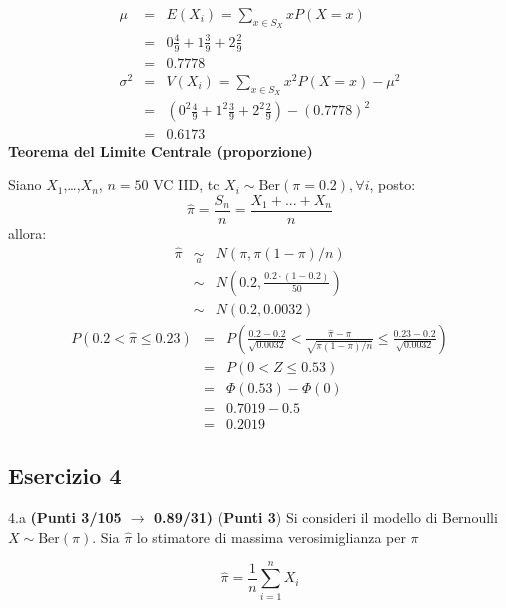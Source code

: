 \documentclass[
  11pt,
]{book}
\theoremstyle{mytheoremstyle}
\theoremstyle{mydefstyle}
\newenvironment{sol}
  {
  \begin{tcolorbox}[enhanced,breakable,arc=0.1mm,boxrule=1pt,colback=white,colframe=iblue,
  title=\bf \fontfamily{lmss}\selectfont \hspace{.5 cm} Soluzione,drop fuzzy shadow]

}{
\end{tcolorbox}
  }
\begin{document}
\begin{sol}
\begin{eqnarray*} \mu &=& E(X_i) = \sum_{x\in S_X}x P(X=x)\\ 
 &=&  0  \frac { 4 }{ 9 }+ 1  \frac { 3 }{ 9 }+ 2  \frac { 2 }{ 9 } \\ 
            &=& 0.7778 \\ 
 \sigma^2 &=& V(X_i) = \sum_{x\in S_X}x^2 P(X=x)-\mu^2\\ 
 &=&\left(  0  ^2\frac { 4 }{ 9 }+ 1  ^2\frac { 3 }{ 9 }+ 2  ^2\frac { 2 }{ 9 } \right)-( 0.7778 )^2\\ 
            &=& 0.6173 
\end{eqnarray*}
\textbf{Teorema del Limite Centrale (proporzione)}

Siano \(X_1\),\ldots,\(X_n\), \(n=50\) VC IID, tc \(X_i\sim\text{Ber}(\pi=0.2)\)\(,\forall i\), posto:
\[
      \hat\pi=\frac{S_n}n = \frac{X_1 + ... + X_n}n
      \]
allora:\begin{eqnarray*}
  \hat\pi & \mathop{\sim}\limits_{a}& N(\pi,\pi(1-\pi)/n) \\
  &\sim & N\left(0.2,\frac{0.2\cdot(1-0.2)}{50}\right) \\
     &\sim & N(0.2,0.0032) 
  \end{eqnarray*}\begin{eqnarray*}
   P( 0.2 < \hat\pi \leq  0.23 ) &=& P\left( \frac { 0.2  -  0.2 }{\sqrt{ 0.0032 }} < \frac { \hat\pi  -  \pi }{ \sqrt{\pi(1-\pi)/n} } \leq \frac { 0.23  -  0.2 }{\sqrt{ 0.0032 }}\right)  \\
              &=& P\left(  0  < Z \leq  0.53 \right) \\
              &=& \Phi( 0.53 )-\Phi( 0 )\\
              &=&  0.7019 - 0.5 \\ 
              &=&  0.2019 
   \end{eqnarray*}

\end{sol}

\subsection{Esercizio 4}\label{esercizio-4-37}

4.a \textbf{(Punti 3/105 \(\rightarrow\) 0.89/31)} (\textbf{Punti 3}) Si consideri il modello di Bernoulli \(X\sim\text{Ber}(\pi)\). Sia \(\hat\pi\) lo stimatore di massima verosimiglianza per \(\pi\)

\[
  \hat\pi = \frac 1n \sum_{i=1}^n X_i
\]
\end{document}
